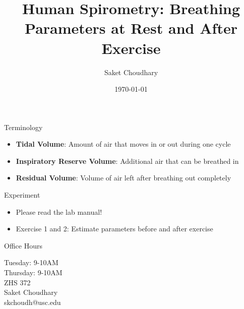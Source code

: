 \documentclass[10pt]{beamer}
\title{Human Spirometry: Breathing Parameters at Rest and After Exercise}
\date{\today}
\author{Saket Choudhary}
\institute{BISC 104\\Session 11}
\begin{document}
\maketitle

\begin{frame}[fragile]{Terminology}
\begin{itemize}
\item \textbf{Tidal Volume}: Amount of air that moves in or out during one cycle
\item \textbf{Inspiratory Reserve Volume}: Additional air that can be breathed in
\item \textbf{Residual Volume}: Volume of air left after breathing out completely
\end{itemize}
\end{frame}

\begin{frame}[fragile]{Experiment}
\begin{itemize}
\item Please read the lab manual!
\item Exercise 1 and 2: Estimate parameters before and after exercise
\end{itemize}
\end{frame}

\begin{frame}[fragile]{Office Hours}
\Large \begin{center}Tuesday: 9-10AM\\
Thursday: 9-10AM\\
ZHS 372\\
\vspace*{2cm}
Saket Choudhary\\ 
skchoudh@usc.edu\\
\end{center}
\end{frame}
\end{document}
